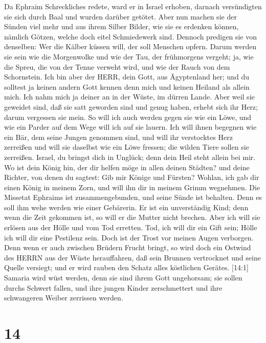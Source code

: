  Da Ephraim Schreckliches redete, ward er in Israel erhoben,
darnach versündigten sie sich durch Baal und wurden darüber getötet.
 Aber nun machen sie der Sünden viel mehr und aus ihrem
Silber Bilder, wie sie es erdenken können, nämlich Götzen, welche doch
eitel Schmiedewerk sind. Dennoch predigen sie von denselben: Wer die
Kälber küssen will, der soll Menschen opfern.  Darum werden
sie sein wie die Morgenwolke und wie der Tau, der frühmorgens vergeht;
ja, wie die Spreu, die von der Tenne verweht wird, und wie der Rauch von
dem Schornstein.  Ich bin aber der HERR, dein Gott, aus
Ägyptenland her; und du solltest ja keinen andern Gott kennen denn mich
und keinen Heiland als allein mich.  Ich nahm mich ja deiner
an in der Wüste, im dürren Lande.  Aber weil sie geweidet
sind, daß sie satt geworden sind und genug haben, erhebt sich ihr Herz;
darum vergessen sie mein.  So will ich auch werden gegen sie
wie ein Löwe, und wie ein Parder auf dem Wege will ich auf sie lauern.
 Ich will ihnen begegnen wie ein Bär, dem seine Jungen
genommen sind, und will ihr verstocktes Herz zerreißen und will sie
daselbst wie ein Löwe fressen; die wilden Tiere sollen sie zerreißen.
 Israel, du bringst dich in Unglück; denn dein Heil steht
allein bei mir.  Wo ist dein König hin, der dir helfen möge
in allen deinen Städten? und deine Richter, von denen du sagtest: Gib
mir Könige und Fürsten?  Wohlan, ich gab dir einen König in
meinem Zorn, und will ihn dir in meinem Grimm wegnehmen. 
Die Missetat Ephraims ist zusammengebunden, und seine Sünde ist
behalten.  Denn es soll ihm wehe werden wie einer
Gebärerin. Er ist ein unverständig Kind; denn wenn die Zeit gekommen
ist, so will er die Mutter nicht brechen.  Aber ich will
sie erlösen aus der Hölle und vom Tod erretten. Tod, ich will dir ein
Gift sein; Hölle ich will dir eine Pestilenz sein. Doch ist der Trost
vor meinen Augen verborgen.  Denn wenn er auch zwischen
Brüdern Frucht bringt, so wird doch ein Ostwind des HERRN aus der Wüste
herauffahren, daß sein Brunnen vertrocknet und seine Quelle versiegt;
und er wird rauben den Schatz alles köstlichen Gerätes. 
{[}14:1{]} Samaria wird wüst werden, denn sie sind ihrem Gott
ungehorsam; sie sollen durchs Schwert fallen, und ihre jungen Kinder
zerschmettert und ihre schwangeren Weiber zerrissen werden.

\hypertarget{section-13}{%
\section{14}\label{section-13}}

